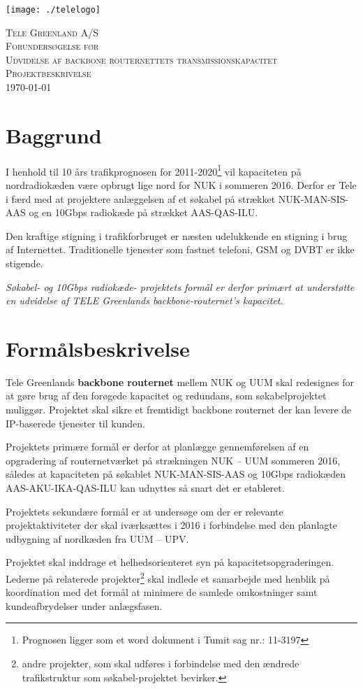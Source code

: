 \documentclass[11pt,a4paper]{article}
\begin{document}
\begin{flushright}
\texttt{[image: ./telelogo]}~\\[1cm] %
\end{flushright}
\begin{center}
\textsc{\LARGE Tele Greenland A/S}\\[1cm]
\textsc{\huge Forundersøgelse før} \\ [1cm]
\textsc{\huge Udvidelse af backbone routernettets transmissionskapacitet} \\ [1cm]\textsc{\Large Projektbeskrivelse}\\[0.5cm]
{\large \today} %
\end{center}

\tableofcontents

\section{Baggrund}
I henhold til 10 års trafikprognosen for 2011-2020\footnote{
Prognosen ligger som et word dokument i Tumit sag nr.: 11-3197
}
vil kapaciteten på nordradiokæden være opbrugt lige nord for NUK i sommeren 2016. Derfor er Tele i færd med at projektere anlæggelsen af et søkabel på strækket NUK-MAN-SIS-AAS og en 10Gbps radiokæde på strækket AAS-QAS-ILU.
\par
Den kraftige stigning i trafikforbruget er næsten udelukkende en stigning i brug af Internettet. Traditionelle tjenester som fastnet telefoni, GSM og DVBT er ikke stigende.
\par
{\em Søkabel- og 10Gbps radiokæde- projektets formål er derfor primært at understøtte en udvidelse af TELE Greenlands backbone-routernet's kapacitet.}
\section{Formålsbeskrivelse}
Tele Greenlands \textbf{backbone routernet} mellem NUK og UUM skal redesignes for at gøre brug af den forøgede kapacitet og redundans, som  søkabelprojektet muliggør. Projektet skal sikre et fremtidigt backbone routernet der kan levere de IP-baserede tjenester til kunden. 
\par
Projektets primære formål er derfor at planlægge gennemførelsen af en opgradering af routernetværket på strækningen NUK – UUM sommeren 2016, således at kapaciteten på søkablet NUK-MAN-SIS-AAS og 10Gbps radiokæden AAS-AKU-IKA-QAS-ILU kan udnyttes så snart det er etableret.
\par
Projektets sekundære formål er at undersøge om der er relevante projektaktiviteter der skal iværksættes i 2016 i forbindelse med den planlagte udbygning af nordkæden fra UUM – UPV.
\par
Projektet skal inddrage et helhedsorienteret syn på kapacitetsopgraderingen. Lederne på relaterede projekter\footnote{andre projekter, som skal udføres i forbindelse med den ændrede trafikstruktur som søkabel-projektet bevirker.} skal indlede et samarbejde med henblik på koordination med det formål at minimere de samlede omkostninger samt kundeafbrydelser under anlægsfasen.
\end{document}
